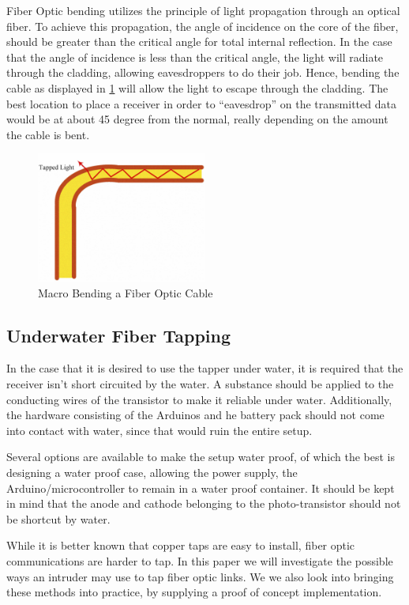 \documentclass[11pt,twoside,a4paper]{scrartcl}
\begin{document}
		Fiber Optic bending utilizes the principle of light propagation through an optical fiber.
		To achieve this propagation, the angle of incidence on the core of the fiber,
		should be greater than the critical angle for total internal reflection.
		In the case that the angle of incidence is less than the critical angle, the light will radiate through the cladding,
		allowing eavesdroppers to do their job.
		Hence, bending the cable as displayed in \cref{fig:bending} will allow the light to escape through the cladding.
		The best location to place a receiver in order to ``eavesdrop'' on the transmitted data would be at about 45 degree from the normal,
		really depending on the amount the cable is bent. 
		\begin{figure}[htbp]
			\centering
			\includegraphics[width=0.5\textwidth]{bending}
			\caption{Macro Bending a Fiber Optic Cable}
			\label{fig:bending}
		\end{figure}

	\subsection{Underwater Fiber Tapping}
		In the case that it is desired to use the tapper under water, it is required that the receiver isn't short circuited by the water.
		A substance should be applied to the conducting wires of the transistor to make it reliable under water.
		Additionally, the hardware consisting of the Arduinos and he battery pack should not come into contact with water,
		since that would ruin the entire setup. 

		Several options are available to make the setup water proof, of which the best is designing a water proof case, allowing the power supply,
		the Arduino/microcontroller to remain in a water proof container.
		It should be kept in mind that the anode and cathode belonging to the photo-transistor should not be shortcut by water.

		While it is better known that copper taps are easy to install, fiber optic communications are harder to tap.
		In this paper we will investigate the possible ways an intruder may use to tap fiber optic links.
		We we also look into bringing these methods into practice, by supplying a proof of concept implementation.
\end{document}
